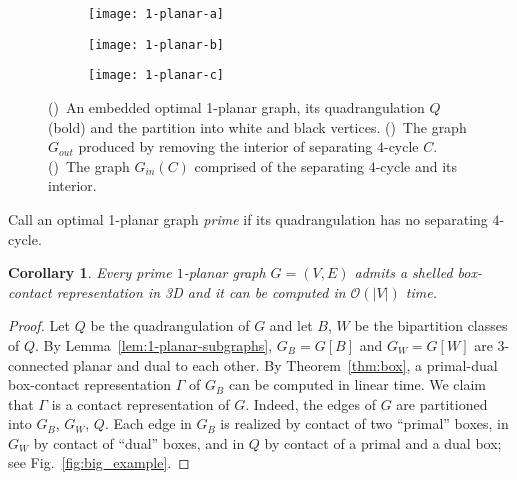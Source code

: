 \documentclass{article}
\newcounter{dummycount}
\newtheorem{corollary}[theorem]{Corollary}
\newenvironment{backInTime}[1]
{
\setcounter{dummycount}{\value{theorem}}
\setcounter{theorem}{\value{#1}}
}
{
\setcounter{theorem}{\value{dummycount}}
}
\newcommand{\df}{\textit}
\newcommand{\Oh}{{\ensuremath{\mathcal{O}}}}
\begin{document}
\begin{figure}[htb]
\centering
  \begin{subfigure}[t]{.3\textwidth}
    \centering
    \texttt{[image: 1-planar-a]}
    \caption{}
    \label{fig:opt-1-planar}
  \end{subfigure}
  \hspace{1em}
  \begin{subfigure}[t]{.3\textwidth}
    \centering
    \texttt{[image: 1-planar-b]}
    \caption{}
    \label{fig:opt-H1}
  \end{subfigure}
  \hspace{2em}
  \begin{subfigure}[t]{.15\textwidth}
    \texttt{[image: 1-planar-c]}
    \caption{}
    \label{fig:opt-H2}
  \end{subfigure}
  \caption{()~An embedded optimal 1-planar graph, its quadrangulation $Q$ (bold) and the partition into white and black vertices.
  ()~The graph $G_{out}$ produced by removing the interior of separating $4$-cycle $C$.
  ()~The graph $G_{in}(C)$ comprised of the separating $4$-cycle and its interior.}
\end{figure}




Call an optimal 1-planar graph \df{prime} if its quadrangulation has no separating $4$-cycle.

\begin{backInTime}{th-prime}
\begin{corollary}\label{cor:goodCase}
Every prime $1$-planar graph $G=(V,E)$ admits a shelled box-contact representation
in 3D and it can be computed in $\Oh(|V|)$ time.
\end{corollary}
\end{backInTime}
\begin{proof}
Let $Q$ be the quadrangulation of $G$ and let $B$, $W$ be the bipartition classes of $Q$.
 By Lemma~\ref{lem:1-planar-subgraphs}, $G_B = G[B]$ and $G_W = G[W]$ are $3$-connected planar and dual to each other.
 By Theorem~\ref{thm:box}, a primal-dual box-contact representation $\Gamma$ of $G_B$
 can be computed in linear time.
 We claim that $\Gamma$ is a contact representation of $G$.
 Indeed, the edges of $G$ are partitioned into $G_B$, $G_W$, $Q$.
 Each edge in $G_B$ is realized by contact of two ``primal'' boxes, in $G_W$ by contact of ``dual'' boxes, and in $Q$ by contact of a primal and a dual box; see Fig.~\ref{fig:big_example}.
\end{proof}
\end{document}
